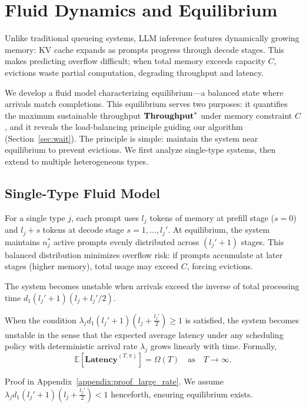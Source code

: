 \section{Fluid Dynamics and Equilibrium}\label{sec:fluid}
Unlike traditional queueing systems, LLM inference features dynamically growing memory: KV cache expands as prompts progress through decode stages. This makes predicting overflow difficult; when total memory exceeds capacity $C$, evictions waste partial computation, degrading throughput and latency.

We develop a fluid model characterizing equilibrium---a balanced state where arrivals match completions. This equilibrium serves two purposes: it quantifies the maximum sustainable throughput $\textbf{Throughput}^*$ under memory constraint $C$, and it reveals the load-balancing principle guiding our algorithm (Section~\ref{sec:wait}). The principle is simple: maintain the system near equilibrium to prevent evictions. We first analyze single-type systems, then extend to multiple heterogeneous types.

\subsection{Single-Type Fluid Model}
For a single type \(j\), each prompt uses \(l_j\) tokens of memory at prefill stage ($s=0$) and \(l_j + s\) tokens at decode stage \(s = 1, \dots, l_j'\). At equilibrium, the system maintains \(n_j^*\) active prompts evenly distributed across $(l_j'+1)$ stages. This balanced distribution minimizes overflow risk: if prompts accumulate at later stages (higher memory), total usage may exceed $C$, forcing evictions.

The system becomes unstable when arrivals exceed the inverse of total processing time $d_1 (l_j' + 1)(l_j + l_j'/2)$.

\begin{proposition}\label{prop:large_rate}
When the condition $\lambda_j d_1 (l_j' + 1) \left( l_j + \frac{l_j'}{2} \right) \geq 1$ is satisfied, the system becomes unstable in the sense that the expected average latency under any scheduling policy with deterministic arrival rate \( \lambda_j \) grows linearly with time. Formally,
$$
\mathbb{E}[\textbf{Latency}^{(T,\pi)}] = \Omega(T) \quad \text{as} \quad T \to \infty.
$$
\end{proposition}

Proof in Appendix~\ref{appendix:proof_large_rate}. We assume $\lambda_j d_1 (l_j' + 1) \left( l_j + \frac{l_j'}{2} \right) <1$ henceforth, ensuring equilibrium exists.

